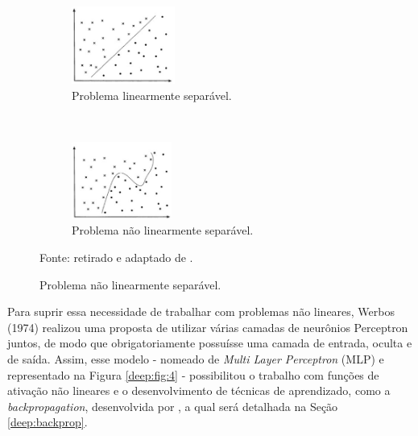 \begin{figure}[H]
   \caption{Representação de problemas linearmente e não linearmente separáveis.}
   \centering
   \label{deep:fig:3}
    \begin{subfigure}[t]{0.45\textwidth}
        \centering
        \includegraphics[height=1in]{recursos/imagens/deep/l_separavel.png}
        \caption{Problema linearmente separável.}
        \label{deep:fig:3.1}
    \end{subfigure}%
    ~ 
    \begin{subfigure}[t]{0.45\textwidth}
        \centering
        \includegraphics[height=1in]{recursos/imagens/deep/nl_separavel.png}
        \caption{Problema não linearmente separável.}
        \label{deep:fig:3.2}
    \end{subfigure}%

    \vspace*{1 cm}
    Fonte: retirado e adaptado de \cite{Goncalves}.
\end{figure}

Para suprir essa necessidade de trabalhar com problemas não lineares, Werbos (1974) \cite{Werbos:74} realizou uma proposta de utilizar várias camadas de neurônios Perceptron juntos, de modo que obrigatoriamente possuísse uma camada de entrada, oculta e de saída. Assim, esse modelo - nomeado de \textit{Multi Layer Perceptron} (MLP) \cite{Werbos:74} e representado na Figura \ref{deep:fig:4} - possibilitou o trabalho com funções de ativação não lineares e o desenvolvimento de técnicas de aprendizado, como a \textit{backpropagation}, desenvolvida por \cite{rumelhart1986learning}, a qual será detalhada na Seção \ref{deep:backprop}.

